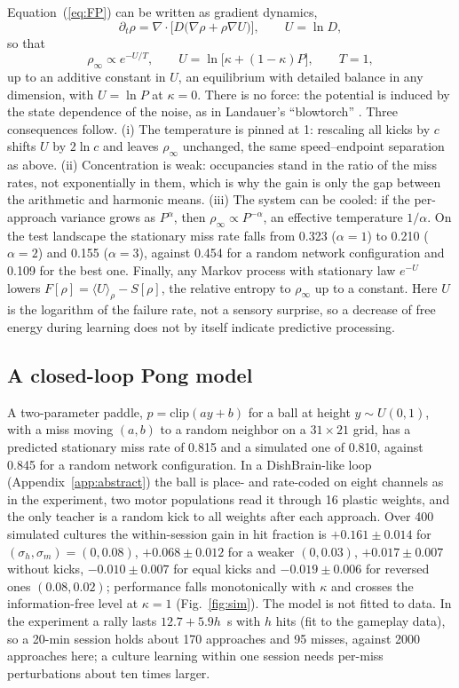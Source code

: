 \documentclass[pre,twocolumn,superscriptaddress,showpacs=false,amsmath,amssymb,nofootinbib]{revtex4-2}
\begin{document}
Equation~(\ref{eq:FP}) can be written as gradient dynamics,
\begin{equation}
\partial_t\rho=\nabla\cdot\bigl[D\bigl(\nabla\rho+\rho\nabla U\bigr)\bigr],\qquad U=\ln D ,
\end{equation}
so that
\begin{equation}
\rho_\infty\propto e^{-U/T},\qquad U=\ln\bigl[\kappa+(1-\kappa)P\bigr],\qquad T=1 ,
\label{eq:boltz}
\end{equation}
up to an additive constant in $U$,
an equilibrium with detailed balance in any dimension, with $U=\ln P$ at $\kappa=0$. There is no force: the potential is induced by the state dependence of the noise, as in Landauer's ``blowtorch'' \cite{Landauer1988}. Three consequences follow. (i) The temperature is pinned at 1: rescaling all kicks by $c$ shifts $U$ by $2\ln c$ and leaves $\rho_\infty$ unchanged, the same speed--endpoint separation as above. (ii) Concentration is weak: occupancies stand in the ratio of the miss rates, not exponentially in them, which is why the gain is only the gap between the arithmetic and harmonic means. (iii) The system can be cooled: if the per-approach variance grows as $P^\alpha$, then $\rho_\infty\propto P^{-\alpha}$, an effective temperature $1/\alpha$. On the test landscape the stationary miss rate falls from 0.323 ($\alpha=1$) to 0.210 ($\alpha=2$) and 0.155 ($\alpha=3$), against 0.454 for a random network configuration and 0.109 for the best one. Finally, any Markov process with stationary law $e^{-U}$ lowers $F[\rho]=\langle U\rangle_\rho-S[\rho]$, the relative entropy to $\rho_\infty$ up to a constant. Here $U$ is the logarithm of the failure rate, not a sensory surprise, so a decrease of free energy during learning does not by itself indicate predictive processing.

\subsection{A closed-loop Pong model}

A two-parameter paddle, $p=\mathrm{clip}(ay+b)$ for a ball at height $y\sim U(0,1)$, with a miss moving $(a,b)$ to a random neighbor on a $31\times21$ grid, has a predicted stationary miss rate of 0.815 and a simulated one of 0.810, against 0.845 for a random network configuration. In a DishBrain-like loop (Appendix~\ref{app:abstract}) the ball is place- and rate-coded on eight channels as in the experiment, two motor populations read it through 16 plastic weights, and the only teacher is a random kick to all weights after each approach. Over 400 simulated cultures the within-session gain in hit fraction is $+0.161\pm0.014$ for $(\sigma_h,\sigma_m)=(0,0.08)$, $+0.068\pm0.012$ for a weaker $(0,0.03)$, $+0.017\pm0.007$ without kicks, $-0.010\pm0.007$ for equal kicks and $-0.019\pm0.006$ for reversed ones $(0.08,0.02)$; performance falls monotonically with $\kappa$ and crosses the information-free level at $\kappa=1$ (Fig.~\ref{fig:sim}). The model is not fitted to data. In the experiment a rally lasts $12.7+5.9h$~s with $h$ hits (fit to the gameplay data), so a 20-min session holds about 170 approaches and 95 misses, against 2000 approaches here; a culture learning within one session needs per-miss perturbations about ten times larger.
\end{document}
